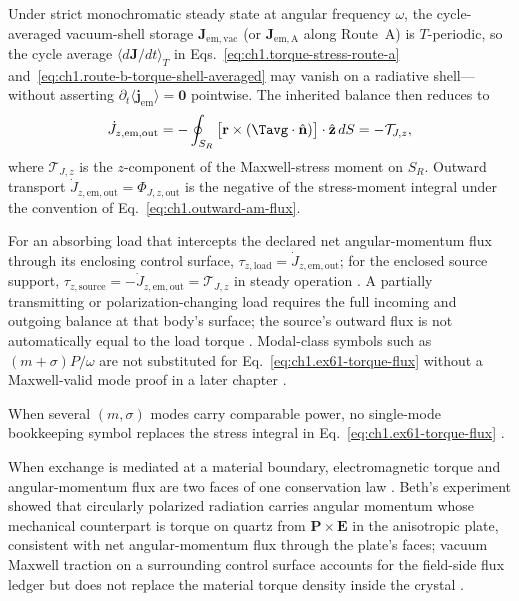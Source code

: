 Under strict monochromatic steady state at angular frequency $\omega$, the cycle-averaged vacuum-shell storage $\mathbf{J}_{\mathrm{em,vac}}$ (or $\mathbf{J}_{\mathrm{em,A}}$ along Route~A) is $T$-periodic, so the cycle average $\langle d\mathbf{J}/dt\rangle_T$ in Eqs.~\eqref{eq:ch1.torque-stress-route-a} and~\eqref{eq:ch1.route-b-torque-shell-averaged} may vanish on a radiative shell---without asserting $\partial_t\langle\mathbf{j}_{\mathrm{em}}\rangle=\mathbf{0}$ pointwise. The inherited balance then reduces to
\begin{equation}
\label{eq:ch1.ex61-torque-flux}
\dot J_{z,\mathrm{em,out}}
=
-\oint_{S_R}
\big[\mathbf{r}\times(\Tavg\cdot\hat{\mathbf{n}})\big]\cdot\hat{\mathbf{z}}\,dS
=-\mathcal{T}_{J,z},
\end{equation}
where \(\mathcal{T}_{J,z}\) is the $z$-component of the Maxwell-stress moment on \(S_R\). Outward transport \(\dot J_{z,\mathrm{em,out}}=\Phi_{J,z,\mathrm{out}}\) is the negative of the stress-moment integral under the convention of Eq.~\eqref{eq:ch1.outward-am-flux}.

For an absorbing load that intercepts the declared net angular-momentum flux through its enclosing control surface, \(\tau_{z,\mathrm{load}}=\dot J_{z,\mathrm{em,out}}\); for the enclosed source support, \(\tau_{z,\mathrm{source}}=-\dot J_{z,\mathrm{em,out}}=\mathcal{T}_{J,z}\) in steady operation \cite{beth1936}. A partially transmitting or polarization-changing load requires the full incoming and outgoing balance at that body’s surface; the source’s outward flux is not automatically equal to the load torque \cite{beth1936,stratton1941}. Modal-class symbols such as $(m+\sigma)P/\omega$ are not substituted for Eq.~\eqref{eq:ch1.ex61-torque-flux} without a Maxwell-valid mode proof in a later chapter \cite{stratton1941}.

When several \((m,\sigma)\) modes carry comparable power, no single-mode bookkeeping symbol replaces the stress integral in Eq.~\eqref{eq:ch1.ex61-torque-flux} \cite{stratton1941}.

When exchange is mediated at a material boundary, electromagnetic torque and angular-momentum flux are two faces of one conservation law \cite{beth1936}. Beth's experiment showed that circularly polarized radiation carries angular momentum whose mechanical counterpart is torque on quartz from $\mathbf P\times\mathbf E$ in the anisotropic plate, consistent with net angular-momentum flux through the plate's faces; vacuum Maxwell traction on a surrounding control surface accounts for the field-side flux ledger but does not replace the material torque density inside the crystal \cite{beth1936,stratton1941}.

